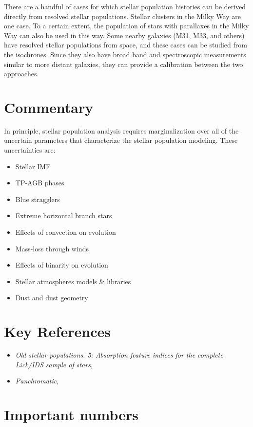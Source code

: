 There are a handful of cases for which stellar population histories
can be derived directly from resolved stellar populations. Stellar
clusters in the Milky Way are one case. To a certain extent, the
population of stars with parallaxes in the Milky Way can also be used
in this way. Some nearby galaxies (M31, M33, and others) have resolved
stellar populations from space, and these cases can be studied from
the isochrones. Since they also have broad band and spectroscopic
measurements similar to more distant galaxies, they can provide a
calibration between the two approaches.

\section{Commentary}

In principle, stellar population analysis requires marginalization
over all of the uncertain parameters that characterize the stellar
population modeling. These uncertainties are:
\begin{itemize}
\item Stellar IMF
\item TP-AGB phases
\item Blue stragglers
\item Extreme horizontal branch stars
\item Effects of convection on evolution
\item Mass-loss through winds
\item Effects of binarity on evolution
\item Stellar atmospheres models \& libraries
\item Dust and dust geometry
\end{itemize}

\section{Key References}

\begin{itemize}
  \item
    {\it Old stellar populations. 5: Absorption feature indices for
    the complete {L}ick/{IDS} sample of stars}, \citet{worthey94}
  \item
    {\it Panchromatic}, \citet{conroy14a}
\end{itemize}

\citet{gunn06a}

\section{Important numbers}

